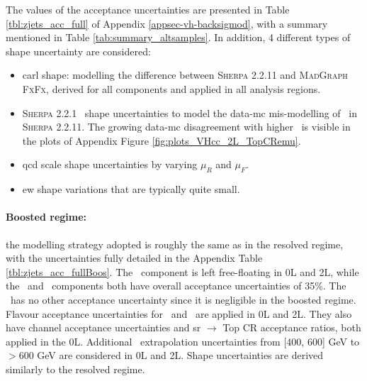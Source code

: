 The values of the acceptance uncertainties are presented in Table \ref{tbl:zjets_acc_full} of Appendix \ref{appsec-vh-backsigmod}, with a summary mentioned in Table \ref{tab:summary_altsamples}. In addition, 4 different types of shape uncertainty are considered:
\begin{itemize}
    \item \gls{carl} shape: modelling the difference between \textsc{Sherpa} 2.2.11 and \textsc{MadGraph FxFx}, derived for all components and applied in all analysis regions.
    \item \textsc{Sherpa} 2.2.1 \ptv\ shape uncertainties to model the data-\gls{mc} mis-modelling of \ptv\ in \textsc{Sherpa} 2.2.11. The growing data-\gls{mc} disagreement with higher \ptv\ is visible in the plots of Appendix Figure \ref{fig:plots_VHcc_2L_TopCRemu}.
    \item \gls{qcd} scale shape uncertainties by varying $\mu_R$ and $\mu_F$.
    \item \gls{ew} shape variations that are typically quite small.
\end{itemize}  %

\paragraph{Boosted regime:} the modelling strategy adopted is roughly the same as in the resolved regime, with the uncertainties fully detailed in the Appendix Table \ref{tbl:zjets_acc_fullBoos}. The \zhf\ component is left free-floating in 0L and 2L, while the \zmf\ and \zlf\ components both have overall acceptance uncertainties of 35\%. The \zlf\ has no other acceptance uncertainty since it is negligible in the boosted regime. Flavour acceptance uncertainties for \zhf\ and \zmf\ are applied in 0L and 2L. They also have channel acceptance uncertainties and \gls{sr} $\rightarrow$ Top CR acceptance ratios, both applied in the 0L. Additional \ptv\ extrapolation uncertainties from [400, 600] GeV to $> 600$ GeV are considered in 0L and 2L. Shape uncertainties are derived similarly to the resolved regime. 

